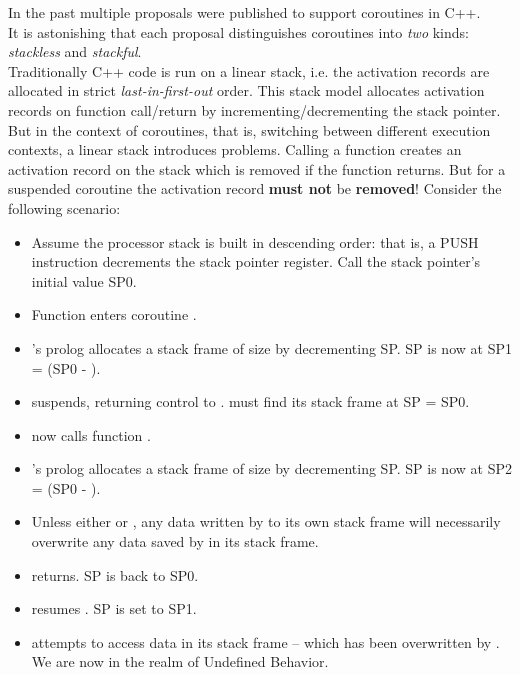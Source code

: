 In the past multiple proposals were published to support coroutines in C++.\\
It is astonishing that each proposal distinguishes coroutines into \emph{two}
kinds: \emph{stackless} and \emph{stackful}.\\
\newline
Traditionally C++ code is run on a linear stack, i.e. the activation
records are allocated in strict \emph{last-in-first-out} order. This stack
model allocates activation records on function call/return by
incrementing/decrementing the stack pointer.\\
But in the context of coroutines, that is, switching between different execution
contexts, a linear stack introduces problems. Calling a function creates an
activation record on the stack which is removed if the function returns.
But for a suspended coroutine the activation record {\bfseries must not} be
{\bfseries removed}!
\newline
Consider the following scenario:
\begin{itemize}
    \item Assume the processor stack is built in descending order: that is, a
          PUSH instruction decrements the stack pointer register. Call the
          stack pointer's initial value SP0.
    \item Function \main enters coroutine .
    \item {}'s prolog allocates a stack frame of
          size  by decrementing SP. SP is now at SP1 =
          (SP0 - ).
    \item {} suspends, returning control to \main. \main must find its
          stack frame at SP = SP0.
    \item \main now calls function .
    \item {}'s prolog allocates a stack frame of
          size  by decrementing SP. SP is now at SP2 =
          (SP0 - ).
    \item Unless either 
          or , any data written by  to
          its own stack frame will necessarily overwrite any data saved
          by  in its stack frame.
    \item {} returns. SP is back to SP0.
    \item \main resumes . SP is set to SP1.
    \item {} attempts to access data in its stack frame -- which has
          been overwritten by . We are now in the realm of Undefined
          Behavior.
\end{itemize}

